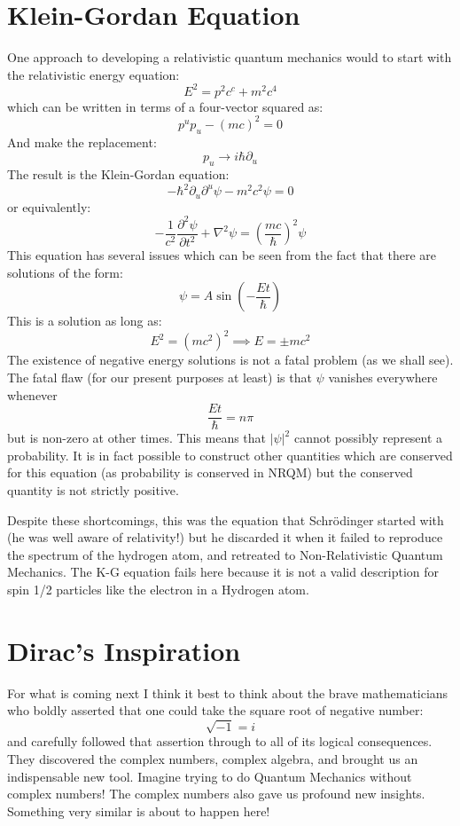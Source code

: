 \documentclass[12pt]{book}
\begin{document}
\section{Klein-Gordan Equation}
One approach to developing a relativistic quantum mechanics would 
to start with the relativistic energy equation:
$$E^2 = p^2c^c + m^2c^4$$
which can be written in terms of a four-vector squared as:
$$p^u p_u - (mc)^2 = 0$$
And make the replacement:
$$p_u \to i \hbar \partial_u$$
The result is the Klein-Gordan equation:
$$-\hbar^2 \partial_u \partial^u \psi - m^2c^2 \psi = 0$$
or equivalently:
$$-\frac{1}{c^2} \frac{\partial^2 \psi}{\partial t^2} + \nabla^2 \psi = \left(\frac{mc}{\hbar}\right)^2 \psi$$
This equation has several issues which can be seen from the fact that there are solutions of the form:
$$\psi = A \sin\left(-\frac{E t}{\hbar}\right) $$
This is a solution as long as:
$$E^2 = (mc^2)^2 \implies E = \pm mc^2$$
The existence of negative energy solutions is not a fatal problem (as we shall see).  The fatal flaw (for our present purposes at least) is that $\psi$ vanishes everywhere whenever
$$\frac{E t}{\hbar} = n\pi$$
but is non-zero at other times.  This means that $|\psi|^2$ cannot possibly represent a probability.  It is in fact possible to construct other quantities which are conserved for this equation (as probability is conserved in NRQM) but the conserved quantity is not strictly positive.

Despite these shortcomings, this was the equation that Schr\"odinger started with (he was well aware of relativity!) but he discarded it when it failed to reproduce the spectrum of the hydrogen atom, and retreated to Non-Relativistic Quantum Mechanics.  The K-G equation fails here because it is not a valid description for spin 1/2 particles like the electron in a Hydrogen atom.

\section{Dirac's Inspiration}

For what is coming next I think it best to think about the brave mathematicians who boldly asserted that one could take the square root of negative number:
$$\sqrt{-1} = i$$
and carefully followed that assertion through to all of its logical consequences.  They discovered the complex numbers, complex algebra, and brought us an indispensable new tool.  Imagine trying to do Quantum Mechanics without complex numbers!  The complex numbers also gave us profound new insights.  Something very similar is about to happen here!
\end{document}
